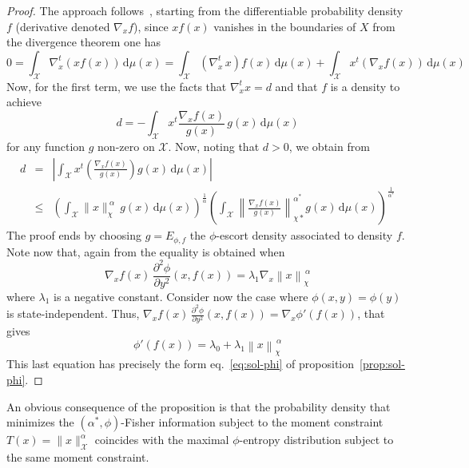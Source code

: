 \documentclass[entropy,article,submit,moreauthors,pdftex]{Definitions/mdpi}
\def\dmu{\mathrm{d}\mu}%
\def\X{\mathcal{X}}%
\begin{document}
\begin{proof}
  The   approach   follows~\cite{Ber13},   starting  from   the   differentiable
  probability  density $f$  (derivative denoted  $\nabla_x f$),  since $x  f(x)$
  vanishes in the boundaries of $X$ from the divergence theorem one has
  \[
  0  = \int_\X  \nabla_x^t \left(  x f(x)  \right) \,  \dmu(x) =  \int_\X \left(
  \nabla_x^t \,  x \right) f(x)  \, \dmu(x) +  \int_\X x^t \left(  \nabla_x f(x)
  \right) \, \dmu(x)
  \]
  Now, for the first term, we use the facts that $\nabla_x^t x = d$ and that $f$
  is a density to achieve
  \[
  d = - \int_\X x^t \frac{\nabla_x f(x)}{g(x)} \, g(x) \, \dmu(x)
  \]
  for any function  $g$ non-zero on $\X$.   Now, noting that $d >  0$, we obtain
  from \cite[Lemma~2]{Ber13}
  \begin{eqnarray*}
  d & = & \left| \int_\X x^t \left( \frac{\nabla_x f(x)}{g(x)} \right) g(x) \,
  \dmu(x) \right|
  \\[2.5mm]
  & \le &  \left( \int_\X \|x\|_\chi^{\: \alpha} \,  g(x) \, \dmu(x)
  \right)^{\frac{1}{\alpha}}     \left(    \int_\X     \left\|    \frac{\nabla_x
    f(x)}{g(x)}\right\|_{\chi*}^{\alpha^*}        g(x)         \,        \dmu(x)
  \right)^{\frac{1}{\alpha^*}}
  \end{eqnarray*}
  The  proof  ends  by  choosing  $g =  E_{\phi,f}$  the  $\phi$-escort  density
  associated to density $f$. Note now that, again from \cite[Lemma~2]{Ber13} the
  equality is obtained when
  \[
  \nabla_x  f(x) \,  \frac{\partial^2 \phi}{\partial  y^2} (x,f(x))  = \lambda_1
  \nabla_x \left\| x \right\|_\chi^{\, \alpha}
  \]
  where  $\lambda_1$  is a  negative  constant.   Consider  now the  case  where
  $\phi(x,y)  =   \phi(y)$  is  state-independent.   Thus,   $\nabla_x  f(x)  \,
  \frac{\partial^2 \phi}{\partial  y^2} (x,f(x))  = \nabla_x  \phi'(f(x))$, that
  gives
  \[
  \phi'(f(x)) = \lambda_0 + \lambda_1 \left\| x \right\|_\chi^{\, \alpha}
  \]
  This  last   equation  has   precisely  the  form   eq.~\eqref{eq:sol-phi}  of
  proposition~\ref{prop:sol-phi}.
\end{proof}
%
An obvious consequence  of the proposition is that the  probability density that
minimizes  the  $(\alpha^*,\phi)$-Fisher  information   subject  to  the  moment
constraint $T(x)  = \|x\|_\X^\alpha$  coincides with the  maximal $\phi$-entropy
distribution subject to the same moment constraint.
\end{document}

